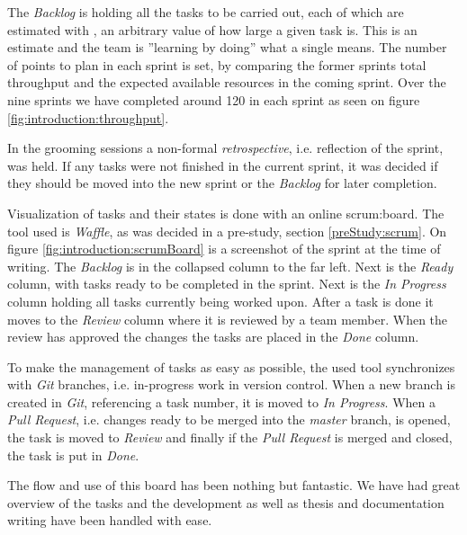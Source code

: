 The \textit{Backlog} is holding all the tasks to be carried out, each of which are estimated with , an arbitrary value of how large a given task is.
This is an estimate and the team is ''learning by doing'' what a single  means.
The number of points to plan in each sprint is set, by comparing the former sprints total throughput and the expected available resources in the coming sprint.
Over the nine sprints we have completed around 120  in each sprint as seen on figure \ref{fig:introduction:throughput}.


In the grooming sessions a non-formal \textit{retrospective}, i.e. reflection of the sprint, was held. 
If any tasks were not finished in the current sprint, it was decided if they should be moved into the new sprint or the \textit{Backlog} for later completion.

Visualization of tasks and their states is done with an online \gls{scrum:board}.
The tool used is \textit{Waffle}, as was decided in a pre-study, section \ref{preStudy:scrum}.
On figure \ref{fig:introduction:scrumBoard} is a screenshot of the sprint at the time of writing.
The \textit{Backlog} is in the collapsed column to the far left.
Next is the \textit{Ready} column, with tasks ready to be completed in the sprint.
Next is the \textit{In Progress} column holding all tasks currently being worked upon.
After a task is done it moves to the \textit{Review} column where it is reviewed by a team member.
When the review has approved the changes the tasks are placed in the \textit{Done} column.


To make the management of tasks as easy as possible, the used tool synchronizes with \textit{Git} branches, i.e. in-progress work in version control. 
When a new branch is created in \textit{Git}, referencing a task number, it is moved to \textit{In Progress}. 
When a \textit{Pull Request}, i.e. changes ready to be merged into the \textit{master} branch, is opened, the task is moved to \textit{Review} and finally if the \textit{Pull Request} is merged and closed, the task is put in \textit{Done}.

The flow and use of this board has been nothing but fantastic.
We have had great overview of the tasks and the development as well as thesis and documentation writing have been handled with ease.

